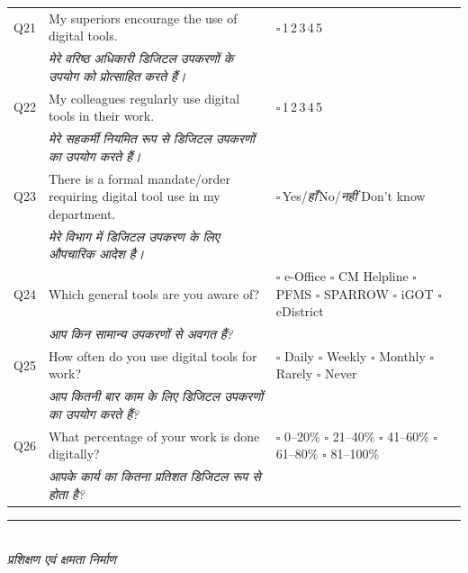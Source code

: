 \documentclass[10pt,a4paper]{article}
\newcommand{\likert}{{\Large$\square$}\,1\quad{\Large$\square$}\,2\quad{\Large$\square$}\,3\quad{\Large$\square$}\,4\quad{\Large$\square$}\,5}
\newcommand{\ymark}{{\Large$\square$}\,Yes/{\hindifont\itshape हाँ}\quad{\Large$\square$}\,No/{\hindifont\itshape नहीं}}
\begin{document}
\noindent\begin{tabularx}{\textwidth}{@{}L{0.8cm} X L{5.2cm}@{}}
Q21 & My superiors encourage the use of digital tools. & \likert \\
 & {\hindifont\small\itshape\color{black!70} मेरे वरिष्ठ अधिकारी डिजिटल उपकरणों के उपयोग को प्रोत्साहित करते हैं।} & \\[3pt]
Q22 & My colleagues regularly use digital tools in their work. & \likert \\
 & {\hindifont\small\itshape\color{black!70} मेरे सहकर्मी नियमित रूप से डिजिटल उपकरणों का उपयोग करते हैं।} & \\[3pt]
Q23 & There is a formal mandate/order requiring digital tool use in my department. & \ymark\quad{\Large$\square$} Don't know \\
 & {\hindifont\small\itshape\color{black!70} मेरे विभाग में डिजिटल उपकरण के लिए औपचारिक आदेश है।} & \\[3pt]
Q24 & Which general tools are you aware of? & {\Large$\square$} e-Office {\Large$\square$} CM Helpline {\Large$\square$} PFMS {\Large$\square$} SPARROW {\Large$\square$} iGOT {\Large$\square$} eDistrict \\
 & {\hindifont\small\itshape\color{black!70} आप किन सामान्य उपकरणों से अवगत हैं?} & \\[3pt]
Q25 & How often do you use digital tools for work? & {\Large$\square$} Daily {\Large$\square$} Weekly {\Large$\square$} Monthly {\Large$\square$} Rarely {\Large$\square$} Never \\
 & {\hindifont\small\itshape\color{black!70} आप कितनी बार काम के लिए डिजिटल उपकरणों का उपयोग करते हैं?} & \\[3pt]
Q26 & What percentage of your work is done digitally? & {\Large$\square$} 0--20\% {\Large$\square$} 21--40\% {\Large$\square$} 41--60\% {\Large$\square$} 61--80\% {\Large$\square$} 81--100\% \\
 & {\hindifont\small\itshape\color{black!70} आपके कार्य का कितना प्रतिशत डिजिटल रूप से होता है?} & \\[3pt]
\end{tabularx}
\newpage
\noindent\rule{\textwidth}{0.3pt}\vspace{3pt}
\\
{\hindifont\itshape\color{black!70} प्रशिक्षण एवं क्षमता निर्माण}\vspace{3pt}
\end{document}

